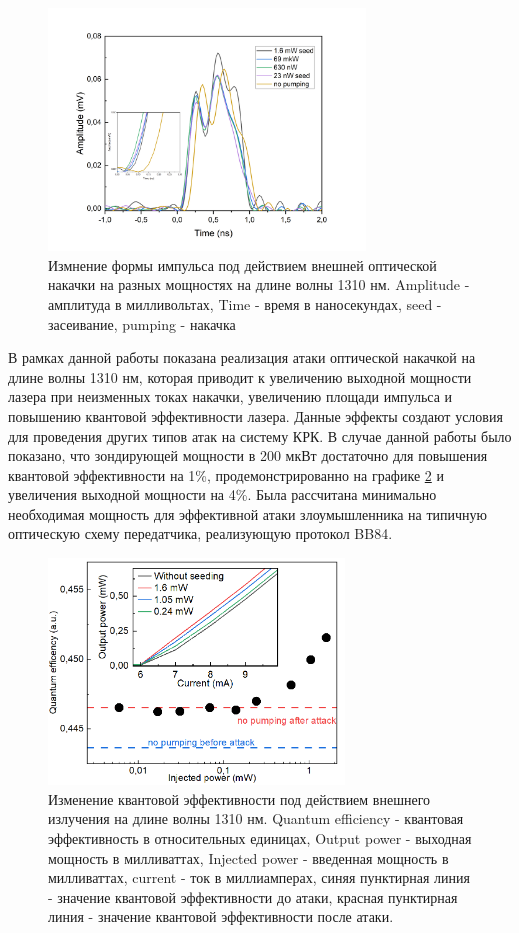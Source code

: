\begin{figure}
    \centering
    \includegraphics[width=0.75\textwidth]{images/Импульсы под действием 1310 для диссера.png}
    \caption{Измнение формы импульса под действием внешней оптической накачки на разных мощностях на длине волны 1310 нм. Amplitude - амплитуда в милливольтах, Time - время в наносекундах, seed - засеивание, pumping - накачка}
    \label{fig:pulses 1310 ref}
\end{figure}
\newpage В рамках данной работы показана реализация атаки оптической накачкой на длине волны 1310 нм, которая приводит к увеличению выходной мощности лазера при неизменных токах накачки, увеличению площади импульса и повышению квантовой эффективности лазера. Данные эффекты создают условия для проведения других типов атак на систему КРК. В случае данной работы было показано, что зондирующей мощности в 200 мкВт достаточно для повышения квантовой эффективности на 1\%, продемонстрированно на графике \ref{fig:eff ref} и увеличения выходной мощности на 4\%. Была рассчитана минимально необходимая мощность для эффективной атаки злоумышленника на типичную оптическую схему передатчика, реализующую протокол BB84.
\begin{figure}
    \centering
    \includegraphics[width=0.7\textwidth]{images/Эффективность 1310.png}
    \caption{Изменение квантовой эффективности под действием внешнего излучения на длине волны 1310 нм. Quantum efficiency - квантовая эффективность в относительных единицах, Output power - выходная мощность в милливаттах, Injected power - введенная мощность в милливаттах, current - ток в миллиамперах, синяя пунктирная линия - значение квантовой эффективности до атаки, красная пунктирная линия - значение квантовой эффективности после атаки. }
    \label{fig:eff ref}
\end{figure}

